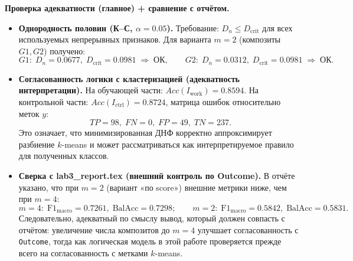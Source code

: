 \documentclass[a4paper,12pt]{article}
\begin{document}
\textbf{Проверка адекватности (главное) + сравнение с отчётом.}
\begin{itemize}
  \item \textbf{Однородность половин (К--С, \(\alpha=0.05\)).}
  Требование: \(D_n\le D_{\text{crit}}\) для всех используемых непрерывных признаков.
  Для варианта \(m=2\) (композиты \(G1,G2\)) получено:
  \[
  G1:\;D_n=0.0677,\;D_{\text{crit}}=0.0981\;\Rightarrow\;\text{ОК},\qquad
  G2:\;D_n=0.0312,\;D_{\text{crit}}=0.0981\;\Rightarrow\;\text{ОК}.
  \]

  \item \textbf{Согласованность логики с кластеризацией (адекватность интерпретации).}
  На обучающей части: \(Acc(I_{\text{work}})=0.8594\).
  На контрольной части: \(Acc(I_{\text{ctrl}})=0.8724\), матрица ошибок относительно меток \(y\):
  \[
  TP=98,\;FN=0,\;FP=49,\;TN=237.
  \]
  Это означает, что минимизированная ДНФ корректно аппроксимирует разбиение \(k\)-means и может
  рассматриваться как интерпретируемое правило для полученных классов.

  \item \textbf{Сверка с lab3\_report.tex (внешний контроль по Outcome).}
  В отчёте указано, что при \(m=2\) (вариант «по score») внешние метрики ниже, чем при \(m=4\):
  \[
  m=4:\;\mathrm{F1_{macro}}=0.7261,\;\mathrm{BalAcc}=0.7298;\qquad
  m=2:\;\mathrm{F1_{macro}}=0.5842,\;\mathrm{BalAcc}=0.5831.
  \]
  Следовательно, адекватный по смыслу вывод, который должен совпасть с отчётом:
  увеличение числа композитов до \(m=4\) улучшает согласованность с \texttt{Outcome},
  тогда как логическая модель в этой работе проверяется прежде всего на согласованность с метками \(k\)-means.
\end{itemize}
\end{document}
